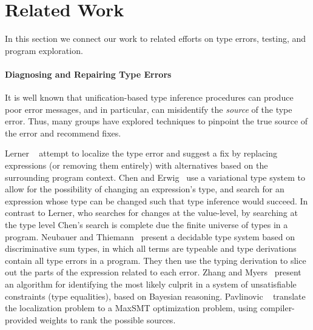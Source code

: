 \section{Related Work}
\label{sec:related-work}
In this section we connect our work to related efforts on type errors,
testing, and program exploration.


\paragraph{Diagnosing and Repairing Type Errors}
\label{sec:diagnosis-repair}
It is well known that unification-based type inference procedures can
produce poor error messages, and in particular, can misidentify the
\emph{source} of the type error.
%
Thus, many groups have explored techniques to pinpoint the true source
of the error and recommend fixes.

Lerner \etal~\cite{Lerner2007-dt} attempt to localize the type
error and suggest a fix by replacing expressions (or removing them
entirely) with alternatives based on the surrounding program context.
%
Chen and Erwig~\cite{Chen2014-gd} use a variational type
system to allow for the possibility of changing an expression's type,
and search for an expression whose type can be changed such that type
inference would succeed.
%
%
In contrast to Lerner, who searches for changes at the
value-level, by searching at the type level Chen's search is complete due
the finite universe of types in a program.
%
Neubauer and Thiemann~\cite{Neubauer2003-xv} present a
decidable type system based on discriminative sum types, in which all
terms are typeable and type derivations contain all type errors in a
program. They then use the typing derivation to slice out the parts of
the expression related to each error.
%
Zhang and Myers~\cite{Zhang2014-lv} present an algorithm for
identifying the most likely culprit in a system of unsatisfiable
constraints (\eg type equalities), based on Bayesian reasoning.
%
Pavlinovic \etal~\cite{Pavlinovic2014-mr} translate the %
localization problem to a MaxSMT optimization problem, using
compiler-provided weights to rank the possible sources.

